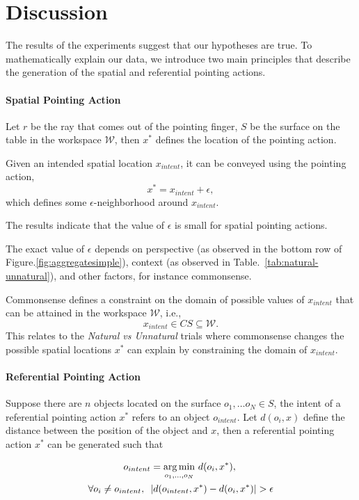 \section{Discussion}
The results of the experiments suggest that our hypotheses are true. To mathematically explain our data, we introduce two main principles that describe the generation of the spatial and referential pointing actions. 

\paragraph{Spatial Pointing Action} Let $r$ be the ray that comes out of the pointing finger, $S$ be the surface on the table in the workspace $\mathcal{W}$, then $x^*$ defines the location of the pointing action.

Given an intended spatial location $x_{intent}$, it can be conveyed using the pointing action,
$$ x^* = x_{intent} + \epsilon,$$ 
which defines some $ \epsilon$-neighborhood around $x_{intent}$. 

The results indicate that the value of $\epsilon$ is small for spatial pointing actions. 

The exact value of $\epsilon$  depends on perspective (as observed in the bottom row of Figure.\ref{fig:aggregatesimple}), context (as observed in Table.~\ref{tab:natural-unnatural}), and other factors, for instance commonsense. 
 
Commonsense defines a constraint on the domain of possible values of $x_{intent}$ that can be attained in the workspace $\mathcal{W}$, i.e., 
$$x_{intent}\in CS \subseteq \mathcal{W}.$$ 
This relates to the \textit{Natural vs Unnatural} trials where commonsense changes the possible spatial locations $x^*$ can explain by constraining the domain of $x_{intent}$.
 

\paragraph{Referential Pointing Action}
Suppose there are $n$ objects located on the surface $o_1, \dots o_N \in S$, the intent of a referential pointing action $x^*$ refers to an object $o_{intent}$. Let $d(o_i,x)$ define the distance between the position of the object and $x$, then a referential pointing action $x^*$ can be generated such that

\begin{align*}
    o_{intent} &= \underset{{o_1,\dots, o_N}}{\operatorname*{arg\,min}}\ d( o_i, x^* ), \\
    \forall o_i\neq o_{intent},\ \ &| d( o_{intent}, x^* )  - d( o_{i}, x^* ) | > \epsilon
\end{align*}



